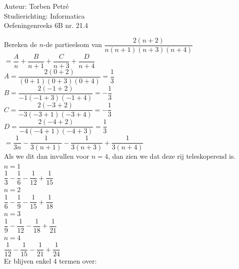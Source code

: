 \documentclass[a4paper]{article}
\begin{document}
  
\noindent \large Auteur: Torben Petré \\
\noindent \large Studierichting: Informatica\\
\noindent \large Oefeningenreeks 6B nr. 21.4\\

\medskip

\normalsize

Bereken de $n$-de partieelsom van $\dfrac{2(n+2)}{n(n+1)(n+3)(n+4)}$ \\

$= \dfrac{A}{n}+\dfrac{B}{n+1}+\dfrac{C}{n+3}+\dfrac{D}{n+4}$ \\

$A = \dfrac{2(0+2)}{(0+1)(0+3)(0+4)} = \dfrac{1}{3}$ \\

$B = \dfrac{2(-1+2)}{-1(-1+3)(-1+4)} = -\dfrac{1}{3}$ \\

$C = \dfrac{2(-3+2)}{-3(-3+1)(-3+4)} = -\dfrac{1}{3}$ \\

$D = \dfrac{2(-4+2)}{-4(-4+1)(-4+3)} = \dfrac{1}{3}$ \\

$= \dfrac{1}{3n} - \dfrac{1}{3(n+1)} - \dfrac{1}{3(n+3)} + \dfrac{1}{3(n+4)}$ \\

Als we dit dan invullen voor $n = 4$, dan zien we dat deze rij teleskoperend is. \\

$n = 1$\\

$\dfrac{1}{3} - \dfrac{1}{6} - \dfrac{1}{12} + \dfrac{1}{15}$\\

$n = 2$\\

$\dfrac{1}{6} - \dfrac{1}{9} - \dfrac{1}{15} + \dfrac{1}{18}$\\

$n = 3$\\

$\dfrac{1}{9} - \dfrac{1}{12} - \dfrac{1}{18} + \dfrac{1}{21}$\\

$n = 4$\\

$\dfrac{1}{12} - \dfrac{1}{15} - \dfrac{1}{21} + \dfrac{1}{24}$\\

Er blijven enkel 4 termen over: \\
\end{document}
